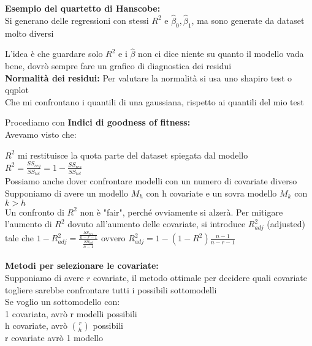 \textbf{Esempio del quartetto di Hanscobe:}\\
Si generano delle regressioni con stessi $R^2$ e $\hat{\beta}_0,\hat{\beta}_1$, ma sono generate da dataset molto diversi\\

L'idea è che guardare solo $R^2$ e i $\hat{\beta}$ non ci dice niente su quanto il modello vada bene, dovrò sempre fare un grafico di diagnostica dei residui\\


\textbf{Normalità dei residui:}
Per valutare la normalità si usa uno shapiro test o qqplot\\
Che mi confrontano i quantili di una gaussiana, rispetto ai quantili del mio test\\




Procediamo con \textbf{Indici di goodness of fitness:}\\

Avevamo visto che:

$R^2$ mi restituisce la quota parte del dataset spiegata dal modello \ \ $R^2=\frac{SS_{reg}}{SS_{tot}}= 1 - \frac{SS_{res}}{SS_{tot}}$\\

Possiamo anche dover confrontare modelli con un numero di covariate diverso\\
Supponiamo di avere un modello $M_h$ con h covariate e un sovra modello $M_k$ con $k>h$\\
Un confronto di $R^2$ non è "fair", perché ovviamente si alzerà. Per mitigare l'aumento di $R^2$ dovuto all'aumento delle covariate, si introduce $R^2_{adj}$ (adjusted) tale che $1- R^2_{adj}= \frac{\tfrac{SS_{res}}{n-r-1}}{\tfrac{SS_{tot}}{n-1}}$ ovvero $R^2_{adj}=1-(1-R^2)\frac{n-1}{n-r-1}$\\ \\


\textbf{Metodi per selezionare le covariate:}\\

Supponiamo di avere $r$ covariate, il metodo ottimale per decidere quali covariate togliere sarebbe confrontare tutti i possibili sottomodelli\\
Se voglio un sottomodello con:\\
1 covariata, avrò r modelli possibili\\
h covariate, avrò $\binom{r}{h}$ possibili\\
r covariate avrò 1 modello\\

